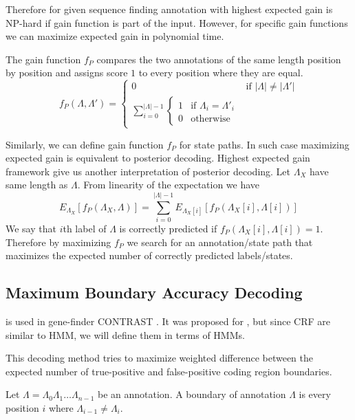 Therefore for given sequence finding annotation with highest expected gain is
NP-hard if gain function is part of the input. However, for specific gain
functions we can maximize expected gain in polynomial time.

The gain function $f_P$ compares the two annotations of the same length position
by position and assigns score $1$ to every position where they are equal.
\begin{equation}
f_P(\Lambda,\Lambda') = 
\begin{cases}
0 & \text{if $|\Lambda|\not=|\Lambda'|$}\\
\sum_{i=0}^{|\Lambda|-1}\begin{cases}
1 & \text{if $\Lambda_i=\Lambda'_i$}\\
0 & \text{otherwise}
\end{cases}
\end{cases}
\end{equation}

Similarly, we can define gain function $f_P$ for state paths. In such case
maximizing expected gain is equivalent to posterior decoding. Highest expected
gain framework give us another interpretation of posterior decoding. Let
$\Lambda_X$  have same length as $\Lambda$. From linearity of the expectation we
have
\[E_{\Lambda_X}[f_P(\Lambda_X,\Lambda)] =
\sum_{i=0}^{|\Lambda|-1}E_{\Lambda_X[i]}[f_P(\Lambda_X[i],\Lambda[i])]\]
We say that $i$th label of $\Lambda$ is correctly predicted if $f_P(\Lambda_X[i],\Lambda[i])=1$. Therefore  
by maximizing $f_P$ we search for an annotation/state path that maximizes the
expected number of correctly predicted labels/states.

\subsection{Maximum Boundary Accuracy Decoding}

 is used in gene-finder
CONTRAST \cite{Gross2007}. It
was proposed for , but since CRF
are similar to HMM, we will define them in terms of HMMs.

This decoding method tries to maximize weighted difference between the expected
number of true-positive and false-positive coding region boundaries.

\begin{definition}
Let $\Lambda=\Lambda_0\Lambda_1\dots\Lambda_{n-1}$ be an annotation. A boundary of
annotation $\Lambda$ is every position $i$ where $\Lambda_{i-1}\not=\Lambda_i$. 
\end{definition}


